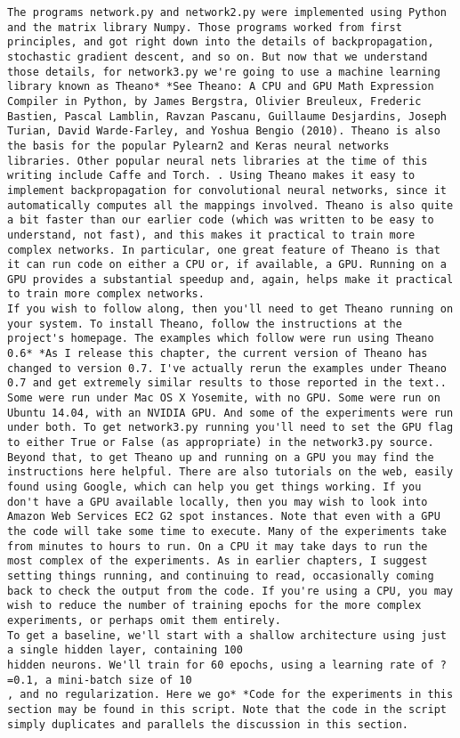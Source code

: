 \begin{lstlisting}
The programs network.py and network2.py were implemented using Python and the matrix library Numpy. Those programs worked from first principles, and got right down into the details of backpropagation, stochastic gradient descent, and so on. But now that we understand those details, for network3.py we're going to use a machine learning library known as Theano* *See Theano: A CPU and GPU Math Expression Compiler in Python, by James Bergstra, Olivier Breuleux, Frederic Bastien, Pascal Lamblin, Ravzan Pascanu, Guillaume Desjardins, Joseph Turian, David Warde-Farley, and Yoshua Bengio (2010). Theano is also the basis for the popular Pylearn2 and Keras neural networks libraries. Other popular neural nets libraries at the time of this writing include Caffe and Torch. . Using Theano makes it easy to implement backpropagation for convolutional neural networks, since it automatically computes all the mappings involved. Theano is also quite a bit faster than our earlier code (which was written to be easy to understand, not fast), and this makes it practical to train more complex networks. In particular, one great feature of Theano is that it can run code on either a CPU or, if available, a GPU. Running on a GPU provides a substantial speedup and, again, helps make it practical to train more complex networks.
If you wish to follow along, then you'll need to get Theano running on your system. To install Theano, follow the instructions at the project's homepage. The examples which follow were run using Theano 0.6* *As I release this chapter, the current version of Theano has changed to version 0.7. I've actually rerun the examples under Theano 0.7 and get extremely similar results to those reported in the text.. Some were run under Mac OS X Yosemite, with no GPU. Some were run on Ubuntu 14.04, with an NVIDIA GPU. And some of the experiments were run under both. To get network3.py running you'll need to set the GPU flag to either True or False (as appropriate) in the network3.py source. Beyond that, to get Theano up and running on a GPU you may find the instructions here helpful. There are also tutorials on the web, easily found using Google, which can help you get things working. If you don't have a GPU available locally, then you may wish to look into Amazon Web Services EC2 G2 spot instances. Note that even with a GPU the code will take some time to execute. Many of the experiments take from minutes to hours to run. On a CPU it may take days to run the most complex of the experiments. As in earlier chapters, I suggest setting things running, and continuing to read, occasionally coming back to check the output from the code. If you're using a CPU, you may wish to reduce the number of training epochs for the more complex experiments, or perhaps omit them entirely.
To get a baseline, we'll start with a shallow architecture using just a single hidden layer, containing 100
hidden neurons. We'll train for 60 epochs, using a learning rate of ?=0.1, a mini-batch size of 10
, and no regularization. Here we go* *Code for the experiments in this section may be found in this script. Note that the code in the script simply duplicates and parallels the discussion in this section.


\end{lstlisting}
